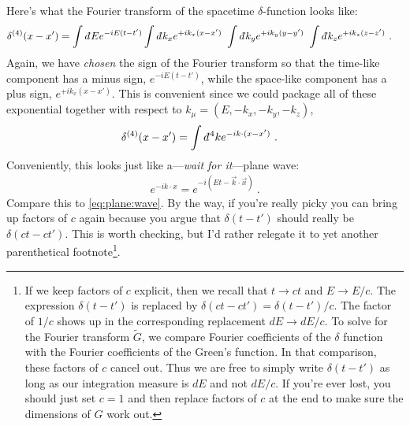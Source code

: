 Here's what the Fourier transform of the spacetime $\delta$-function looks like:
\begin{align}
	\delta^{(4)}(x-x') &=
	\int \dbar E e^{-iE(t-t')}
	\int \dbar k_x e^{+ik_x(x-x')}\
	\int \dbar k_y e^{+ik_y(y-y')}\
	\int \dbar k_z e^{+ik_z(z-z')} \ .
\end{align}
Again, we have \emph{chosen} the sign of the Fourier transform so that the time-like component has a minus sign, $e^{-iE(t-t')}$, while the space-like component has a plus sign, $e^{+ik_x(x-x')}$. This is convenient since we could package all of these exponential together with respect to $k_\mu = (E, -k_x, -k_y, -k_z)$,
\begin{align}
	\delta^{(4)}(x-x') &=
	\int \dbar^4k e^{-ik\cdot (x-x')} \ .
	\label{eq:4D:delta:Fourier}
\end{align}
Conveniently, this looks just like a---\emph{wait for it}---plane wave:
\begin{align}
	e^{-ik\cdot x} = e^{-i\left(Et - \vec{k}\cdot\vec{x}\right)} \ .
\end{align}
Compare this to \eqref{eq:plane:wave}. By the way, if you're really picky you can bring up factors of $c$ again because you argue that $\delta(t-t')$ should really be $\delta(ct-ct')$. This is worth checking, but I'd rather relegate it to yet another parenthetical footnote\footnote{
	If we keep factors of $c$ explicit, then we recall that $t\to ct$ and $E\to E/c$. The expression $\delta(t-t')$ is replaced by $\delta(ct-ct') = \delta(t-t')/c$. The factor of $1/c$ shows up in the corresponding replacement $dE \to dE/c$. To solve for the Fourier transform $\tilde G$, we compare Fourier coefficients of the $\delta$ function with the Fourier coefficients of the Green's function. In that comparison, these factors of $c$ cancel out. Thus we are free to simply write $\delta(t-t')$ as long as our integration measure is $dE$ and not $dE/c$. If you're ever lost, you should just set $c=1$ and then replace factors of $c$ at the end to make sure the dimensions of $G$ work out.
}.


